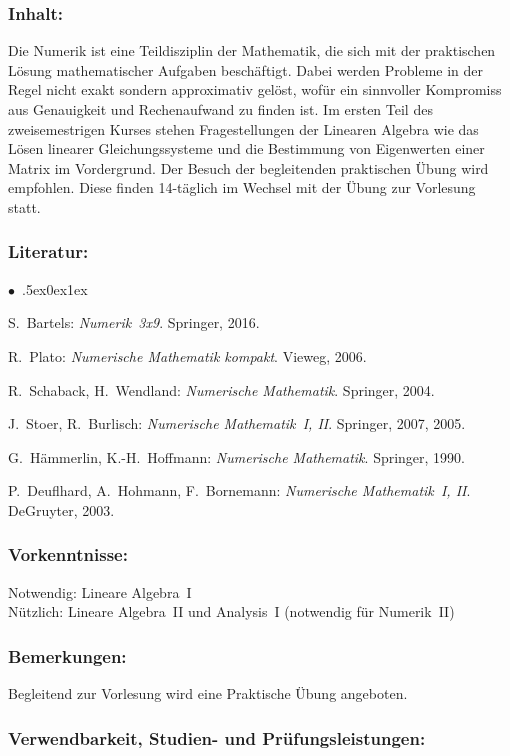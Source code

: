 \documentclass[a4paper,10pt]{article}
\renewenvironment{itemize}{\begin{list}{$\bullet$\ }{\itemsep.5ex\setlength{\topsep}{0.5\itemsep}\parsep0ex\labelsep1ex\settowidth{\labelwidth}{$\bullet$\ }\setlength{\leftmargin}{\labelwidth}\addtolength{\leftmargin}{3ex}\addtolength{\leftmargin}{\labelsep}}}{\end{list}}
\begin{document}
\subsubsection*{\large
    Inhalt:
}
Die Numerik ist eine Teildisziplin der Mathematik, die sich mit der praktischen Lösung mathematischer Aufgaben beschäftigt. Dabei werden Probleme in der Regel nicht exakt sondern approximativ gelöst, wofür ein sinnvoller Kompromiss aus Genauigkeit und Rechenaufwand zu finden ist. Im ersten Teil des zweisemestrigen Kurses stehen Fragestellungen der Linearen Algebra wie das Lösen linearer Gleichungssysteme und die Bestimmung von Eigenwerten einer Matrix im Vordergrund. Der Besuch der begleitenden praktischen Übung wird empfohlen. Diese finden 14-täglich im Wechsel mit der Übung zur Vorlesung statt.
\subsubsection*{\large
    Literatur:
}
\begin{itemize}
\item
S.~Bartels: \emph{Numerik~3x9}. Springer, 2016.
\item
R.~Plato: \emph{Numerische Mathematik kompakt}. Vieweg, 2006.
\item
R.~Schaback, H.~Wendland: \emph{Numerische Mathematik}. Springer, 2004.
\item
J.~Stoer, R.~Burlisch: \emph{Numerische Mathematik~I, II}. Springer, 2007, 2005.
\item
G.~Hämmerlin, K.-H.~Hoffmann: \emph{Numerische Mathematik}. Springer, 1990.
\item
P.~Deuflhard, A.~Hohmann, F.~Bornemann: \emph{Numerische Mathematik~I, II}. DeGruyter, 2003.
\end{itemize}
\subsubsection*{\large
    Vorkenntnisse:
}
Notwendig: Lineare Algebra~I \\
Nützlich: Lineare Algebra~II und Analysis~I (notwendig für Numerik~II)
\subsubsection*{\large
    Bemerkungen:
}
Begleitend zur Vorlesung wird eine Praktische Übung angeboten.
\subsubsection*{\large
    Verwendbarkeit, Studien- und Prüfungsleistungen:
}
\end{document}
